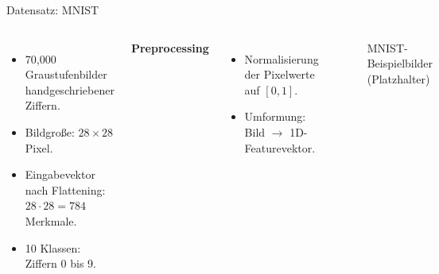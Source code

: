 \documentclass[aspectratio=169]{beamer}
\begin{document}
\begin{frame}{Datensatz: MNIST}
  \begin{columns}[T]
      \begin{itemize}
        \item 70{,}000 Graustufenbilder handgeschriebener Ziffern.
        \item Bildgro\ss e: \(28 \times 28\) Pixel.
        \item Eingabevektor nach Flattening: \(28 \cdot 28 = 784\) Merkmale.
        \item 10 Klassen: Ziffern 0 bis 9.
      \end{itemize}

      \vspace{0.3cm}
      \textbf{Preprocessing}
      \begin{itemize}
        \item Normalisierung der Pixelwerte auf \([0,1]\).
        \item Umformung: Bild \(\rightarrow\) 1D-Featurevektor.
      \end{itemize}

      \begin{figure}
        \centering
        \fbox{\rule{0pt}{3.8cm}\rule{0.95\linewidth}{0pt}}
        \caption{MNIST-Beispielbilder (Platzhalter)}
      \end{figure}
  \end{columns}
\end{frame}
\end{document}
